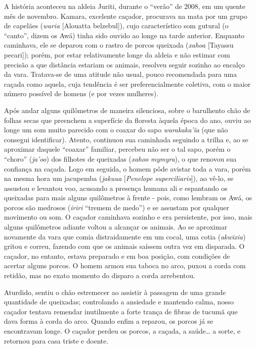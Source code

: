 A história aconteceu na aldeia Juriti, durante o ``verão'' de 2008, em
um quente mês de novembro. Kamara, excelente caçador, procurava na mata
por um grupo de capelães (\emph{waria} {[}Alouatta belzebul{]}), cujo
característico som gutural (o ``canto'', dizem os Awá) tinha sido ouvido
ao longe na tarde anterior. Enquanto caminhava, ele se deparou com o
rastro de porcos queixada (\emph{xahoa} {[}Tayassu pecari{]}); porém,
por estar relativamente longe da aldeia e não estimar com precisão a que
distância estariam os animais, resolveu seguir sozinho ao encalço da
vara. Tratava-se de uma atitude não usual, pouco recomendada para uma
caçada como aquela, cuja tendência é ser preferencialmente coletiva, com
o maior número possível de homens (e por vezes mulheres).

Após andar alguns quilômetros de maneira silenciosa, sobre o barulhento
chão de folhas secas que preenchem a superfície da floresta àquela época
do ano, ouviu ao longe um som muito parecido com o coaxar do sapo
\emph{warakaka'ĩa} (que não consegui identificar). Atento, continuou sua
caminhada seguindo a trilha e, ao se aproximar daquele ``coaxar''
familiar, percebeu não ser o tal sapo, porém o ``choro'' (\emph{ja'oo})
dos filhotes de queixadas (\emph{xahoo} \emph{mymyra}), o que renovou
sua confiança na caçada. Logo em seguida, o homem pôde avistar toda a
vara, porém na mesma hora um jacupemba (\emph{jakuua} {[}\emph{Penelope
superciliaris}{]}), ao vê-lo, se assustou e levantou voo, acusando a
presença humana ali e espantando os queixadas para mais alguns
quilômetros à frente - pois, como lembram os Awá, os porcos são medrosos
(\emph{iriri} ``tremem de medo'') e se assustam por qualquer movimento
ou som. O caçador caminhava sozinho e era persistente, por isso, mais
alguns quilômetros adiante voltou a alcançar os animais. Ao se aproximar
novamente da vara que comia distraidamente em um cocal, uma cotia
(\emph{akwixia}) gritou e correu, fazendo com que os animais saíssem
outra vez em disparada. O caçador, no entanto, estava preparado e em boa
posição, com condições de acertar alguns porcos. O homem armou sua
taboca no arco, puxou a corda com retidão, mas no exato momento do
disparo a corda arrebentou.

Aturdido, sentiu o chão estremecer ao assistir à passagem de uma grande
quantidade de queixadas; controlando a ansiedade e mantendo calma, nosso
caçador tentava remendar inutilmente a forte trança de fibras de tucumã
que dava forma à corda do arco. Quando enfim a reparou, os porcos já se
encontravam longe. O caçador perdeu os porcos, a caçada, a saúde\ldots{} a
sorte, e retornou para casa triste e doente.

